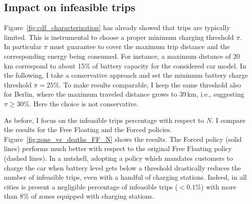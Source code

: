 \subsection{Impact on infeasible trips}

Figure~\ref{fig:cdf_characterization} has already showed that trips are typically limited. This is instrumental to choose a proper minimum charging threshold $\pi$. In particular $\pi$ must guarantee to cover the maximum trip distance and the corresponding energy being consumed. For instance, a maximum distance of 20\,km correspond to about 15\% of battery capacity for the considered car model. In the following, I take a conservative approach and set the minimum battery charge threshold $\pi=25\%$. To make results comparable, I keep the same threshold also for Berlin, where the maximum traveled distance grows to 39\,km, i.e., suggesting $\pi\geq 30\%$. Here the choice is not conservative.

As before, I focus on the infeasible trips percentage with respect to $N$. I compare the results for the Free Floating and the Forced policies. 
Figure~\ref{fig:zone_vs_deaths_FF_N} shows the results. The Forced policy (solid lines) performs much better with respect to the original Free Floating policy (dashed lines). In a nutshell, adopting a policy which mandates customers to charge the car when battery level gets below a threshold drastically reduces the number of infeasible trips, even with a handful of  charging stations. Indeed, in all cities is present a negligible percentage of infeasible trips ($< 0.1 \%$) with more than 8\% of zones equipped with charging stations.

